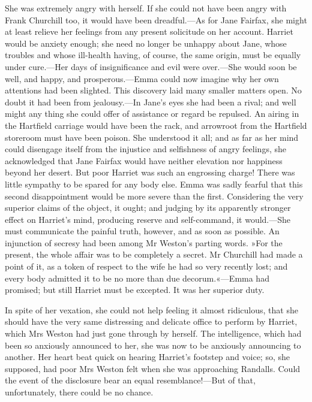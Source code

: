 She was extremely angry with herself. If she could not have been angry with Frank Churchill too, it would have been dreadful.—As for Jane Fairfax, she might at least relieve her feelings from any present solicitude on her account. Harriet would be anxiety enough; she need no longer be unhappy about Jane, whose troubles and whose ill-health having, of course, the same origin, must be equally under cure.—Her days of insignificance and evil were over.—She would soon be well, and happy, and prosperous.—Emma could now imagine why her own attentions had been slighted. This discovery laid many smaller matters open. No doubt it had been from jealousy.—In Jane's eyes she had been a rival; and well might any thing she could offer of assistance or regard be repulsed. An airing in the Hartfield carriage would have been the rack, and arrowroot from the Hartfield storeroom must have been poison. She understood it all; and as far as her mind could disengage itself from the injustice and selfishness of angry feelings, she acknowledged that Jane Fairfax would have neither elevation nor happiness beyond her desert. But poor Harriet was such an engrossing charge! There was little sympathy to be spared for any body else. Emma was sadly fearful that this second disappointment would be more severe than the first. Considering the very superior claims of the object, it ought; and judging by its apparently stronger effect on Harriet's mind, producing reserve and self-command, it would.—She must communicate the painful truth, however, and as soon as possible. An injunction of secresy had been among Mr Weston's parting words. »For the present, the whole affair was to be completely a secret. Mr Churchill had made a point of it, as a token of respect to the wife he had so very recently lost; and every body admitted it to be no more than due decorum.«—Emma had promised; but still Harriet must be excepted. It was her superior duty.

In spite of her vexation, she could not help feeling it almost ridiculous, that she should have the very same distressing and delicate office to perform by Harriet, which Mrs Weston had just gone through by herself. The intelligence, which had been so anxiously announced to her, she was now to be anxiously announcing to another. Her heart beat quick on hearing Harriet's footstep and voice; so, she supposed, had poor Mrs Weston felt when she was approaching Randalls. Could the event of the disclosure bear an equal resemblance!—But of that, unfortunately, there could be no chance.

